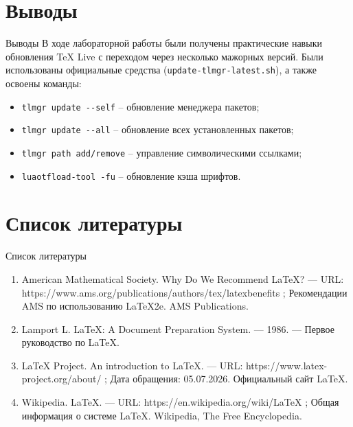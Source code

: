 \documentclass[
  ignorenonframetext,
  aspectratio=169,
  russian,
]{beamer}
\providecommand{\tightlist}{%
  \setlength{\itemsep}{0pt}\setlength{\parskip}{0pt}}
\begin{document}
\section{Выводы}\label{ux432ux44bux432ux43eux434ux44b}

\begin{frame}[fragile]{Выводы}
В ходе лабораторной работы были получены практические навыки обновления
TeX Live с переходом через несколько мажорных версий. Были использованы
официальные средства (\texttt{update-tlmgr-latest.sh}), а также освоены
команды:

\begin{itemize}[<+->]
\tightlist
\item
  \texttt{tlmgr\ update\ -\/-self} -- обновление менеджера пакетов;
\item
  \texttt{tlmgr\ update\ -\/-all} -- обновление всех установленных
  пакетов;
\item
  \texttt{tlmgr\ path\ add/remove} -- управление символическими
  ссылками;
\item
  \texttt{luaotfload-tool\ -fu} -- обновление кэша шрифтов.
\end{itemize}
\end{frame}

\section{Список
литературы}\label{ux441ux43fux438ux441ux43eux43a-ux43bux438ux442ux435ux440ux430ux442ux443ux440ux44b}

\begin{frame}{Список литературы}
\begin{enumerate}[<+->]
\tightlist
\item
  American Mathematical Society. Why Do We Recommend LaTeX? --- URL:
  https://www.ams.org/publications/authors/tex/latexbenefits ;
  Рекомендации AMS по использованию LaTeX2e. AMS Publications.
\item
  Lamport L. LaTeX: A Document Preparation System. --- 1986. --- Первое
  руководство по LaTeX.
\item
  LaTeX Project. An introduction to LaTeX. --- URL:
  https://www.latex-project.org/about/ ; Дата обращения: 05.07.2026.
  Официальный сайт LaTeX.
\item
  Wikipedia. LaTeX. --- URL: https://en.wikipedia.org/wiki/LaTeX ; Общая
  информация о системе LaTeX. Wikipedia, The Free Encyclopedia.
\end{enumerate}
\end{frame}
\end{document}
